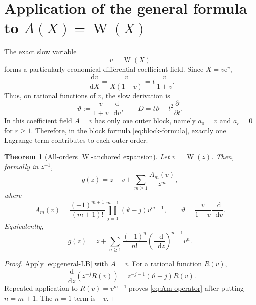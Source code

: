 \documentclass[11pt,oneside]{article}
\theoremstyle{plain}
\newtheorem{theorem}{Theorem}[section]
\theoremstyle{definition}
\theoremstyle{remark}
\newcommand{\W}{\operatorname{W}}
\newcommand{\e}{\mathrm{e}}
\newcommand{\dd}{\mathop{}\!\mathrm{d}}
\begin{document}
\section{Application of the general formula to \texorpdfstring{\(A(X)=\W(X)\)}{A(X)=W(X)}}
\label{sec:application}

The exact slow variable
\begin{equation}
 v=\W(X)
 \label{eq:v-slow}
\end{equation}
forms a particularly economical differential coefficient field.  Since
\(X=v\e^v\),
\begin{equation}
 \frac{\dd v}{\dd X}
 =\frac{v}{X(1+v)}
 =t\,\frac{v}{1+v}.
 \label{eq:dv-dX}
\end{equation}
Thus, on rational functions of \(v\), the slow derivation is
\begin{equation}
 \vartheta:=\frac{v}{1+v}\frac{\dd}{\dd v},
 \qquad D=t\vartheta-t^2\frac{\partial}{\partial t}.
 \label{eq:theta-def}
\end{equation}
In this coefficient field \(A=v\) has only one outer block, namely \(a_0=v\)
and \(a_r=0\) for \(r\ge1\).  Therefore, in the block formula
\eqref{eq:block-formula}, exactly one Lagrange term contributes to each outer
order.

\begin{theorem}[All-orders \(\W\)-anchored expansion]
\label{thm:anchored}
Let \(v=\W(z)\).  Then, formally in \(z^{-1}\),
\begin{equation}
 g(z)=z-v+\sum_{m\ge1}\frac{A_m(v)}{z^m},
 \label{eq:anchored-all}
\end{equation}
where
\begin{equation}
 \boxed{
 A_m(v)=\frac{(-1)^{m+1}}{(m+1)!}
 \prod_{j=0}^{m-1}(\vartheta-j)v^{m+1},
 \qquad
 \vartheta=\frac{v}{1+v}\frac{\dd}{\dd v}.}
 \label{eq:Am-operator}
\end{equation}
Equivalently,
\begin{equation}
 g(z)=z+\sum_{n\ge1}\frac{(-1)^n}{n!}
 \left(\frac{\dd}{\dd z}\right)^{n-1}v^n.
 \label{eq:anchored-derivative}
\end{equation}
\end{theorem}

\begin{proof}
Apply \eqref{eq:general-LB} with \(A=v\).  For a rational function \(R(v)\),
\begin{equation}
 \frac{\dd}{\dd z}\left(z^{-j}R(v)\right)
 =z^{-j-1}(\vartheta-j)R(v).
 \label{eq:shifted-theta}
\end{equation}
Repeated application to \(R(v)=v^{m+1}\) proves
\eqref{eq:Am-operator} after putting \(n=m+1\).  The \(n=1\) term is \(-v\).
\end{proof}
\end{document}
